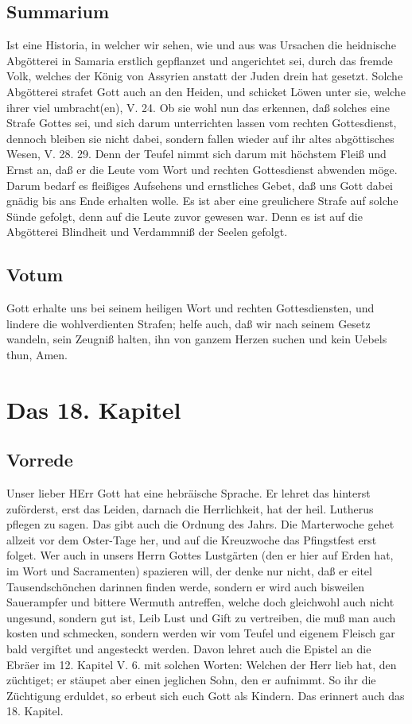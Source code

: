 \section{Summarium}

Ist eine Historia, in welcher wir sehen, wie und aus was Ursachen die heidnische Abgötterei in Samaria erstlich gepflanzet und angerichtet sei, durch das fremde Volk, welches der König von Assyrien anstatt der Juden drein hat gesetzt. Solche Abgötterei strafet Gott auch an den Heiden, und schicket Löwen unter sie, welche ihrer viel umbracht(en), V. 24. Ob sie wohl nun das erkennen, daß solches eine Strafe Gottes sei, und sich darum unterrichten lassen vom rechten Gottesdienst, dennoch bleiben sie nicht dabei, sondern fallen wieder auf ihr altes abgöttisches Wesen, V. 28. 29. Denn der Teufel nimmt sich darum mit höchstem Fleiß und Ernst an, daß er die Leute vom Wort und rechten Gottesdienst abwenden möge. Darum bedarf es fleißiges Aufsehens und ernstliches Gebet, daß uns Gott dabei gnädig bis ans Ende erhalten wolle. Es ist aber eine greulichere Strafe auf solche Sünde gefolgt, denn auf die Leute zuvor gewesen war. Denn es ist auf die Abgötterei Blindheit und Verdammniß der Seelen gefolgt.

\section{Votum}

Gott erhalte uns bei seinem heiligen Wort und rechten Gottesdiensten, und lindere die wohlverdienten Strafen; helfe auch, daß wir nach seinem Gesetz wandeln, sein Zeugniß halten, ihn von ganzem Herzen suchen und kein Uebels thun, Amen.

\chapter{Das 18. Kapitel}

\section{Vorrede}

Unser lieber HErr Gott hat eine hebräische Sprache. Er lehret das hinterst zuförderst, erst das Leiden, darnach die Herrlichkeit, hat der heil. Lutherus pflegen zu sagen. Das gibt auch
die Ordnung des Jahrs. Die Marterwoche gehet allzeit vor dem Oster-Tage her, und auf die Kreuzwoche das Pfingstfest erst folget. Wer auch in unsers Herrn Gottes Lustgärten (den er hier auf Erden hat, im Wort und Sacramenten) spazieren will, der denke nur nicht, daß er eitel Tausendschönchen darinnen finden werde, sondern er wird auch bisweilen Sauerampfer und bittere Wermuth antreffen, welche doch gleichwohl auch nicht ungesund, sondern gut ist, Leib Lust und Gift zu vertreiben, die muß man auch kosten und schmecken, sondern werden wir vom Teufel und eigenem Fleisch gar bald vergiftet und angesteckt werden. Davon lehret auch die Epistel an die Ebräer im 12. Kapitel V. 6. mit solchen Worten: Welchen der Herr lieb hat, den züchtiget; er stäupet aber einen jeglichen Sohn, den er aufnimmt. So ihr die Züchtigung erduldet, so erbeut sich euch Gott als Kindern. Das erinnert auch das 18. Kapitel.

